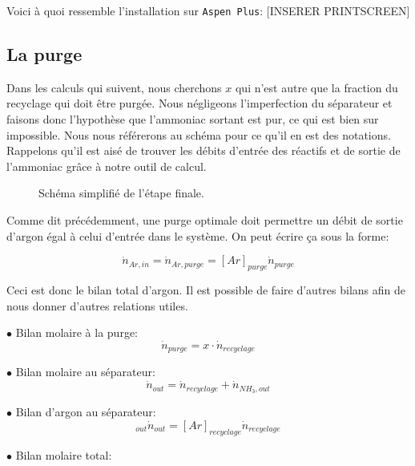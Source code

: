 \documentclass[a4paper, oneside, 12pt]{article}
\begin{document}
Voici à quoi ressemble l'installation sur \texttt{Aspen Plus}:
[INSERER PRINTSCREEN]

\subsection{La purge}

Dans les calculs qui suivent, nous cherchons $x$ qui n'est autre que la fraction du recyclage 
qui doit être purgée. Nous négligeons l'imperfection du séparateur et faisons donc l'hypothèse que l'ammoniac sortant est pur, ce qui est bien sur impossible. Nous nous référerons au schéma pour ce qu'il en est des notations. 
Rappelons qu'il est aisé de trouver les débits d'entrée des réactifs 
et de sortie de l'ammoniac grâce à notre outil de calcul.

\begin{figure}[h!]
	\begin{center}
		
	\end{center}
	\caption{Schéma simplifié de l'étape finale.}
	\label{fig:schema}
\end{figure}

Comme dit précédemment, une purge optimale doit permettre un débit 
de sortie d'argon égal à celui d'entrée dans le système. 
On peut écrire ça sous la forme:

\begin{equation}
\dot{n}_{Ar,in}=\dot{n}_{Ar,purge}=[Ar]_{purge} \dot{n}_{purge}
\end{equation}

Ceci est donc le bilan total d'argon. 
Il est possible de faire d'autres bilans afin de nous donner d'autres relations utiles.

$\bullet$ Bilan molaire à la purge:
\begin{equation}
\dot{n}_{purge} = x \cdot \dot{n}_{recyclage}
\label{eq:bilan_mol_purge}
\end{equation}

$\bullet$ Bilan molaire au séparateur:
\begin{equation}
\dot{n}_{out}=\dot{n}_{recyclage}+\dot{n}_{NH_3,out}
\label{eq:bilan_mol_sep}
\end{equation}

$\bullet$ Bilan d'argon au séparateur:
\begin{equation}
[Ar]_{out} \dot{n}_{out}=[Ar]_{recyclage} \dot{n}_{recyclage}
\end{equation}

$\bullet$ Bilan molaire total:
\end{document}
